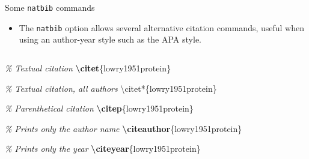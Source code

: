 \documentclass[,aspectratio=43]{beamer}
\newenvironment{Shaded}{\begin{snugshade}}{\end{snugshade}}
\newcommand{\CommentTok}[1]{\textcolor[rgb]{0.38,0.63,0.69}{\textit{#1}}}
\newcommand{\ExtensionTok}[1]{#1}
\newcommand{\FunctionTok}[1]{\textcolor[rgb]{0.02,0.16,0.49}{#1}}
\newcommand{\KeywordTok}[1]{\textcolor[rgb]{0.00,0.44,0.13}{\textbf{#1}}}
\newcommand{\NormalTok}[1]{#1}
\providecommand{\tightlist}{%
  \setlength{\itemsep}{0pt}\setlength{\parskip}{0pt}}
\begin{document}
\begin{frame}[fragile]{Some \texttt{natbib} commands}
\protect\hypertarget{some-natbib-commands}{}
\begin{itemize}
\tightlist
\item
  The \texttt{natbib} option allows several alternative citation
  commands, useful when using an author-year style such as the APA
  style.
\end{itemize}

\begin{columns}[T]
\begin{column}{0.53\textwidth}
\small
\vspace{-1em}

\begin{Shaded}
\begin{Highlighting}[]
\CommentTok{\% Textual citation}
\KeywordTok{\textbackslash{}citet}\NormalTok{\{}\ExtensionTok{lowry1951protein}\NormalTok{\}    }

\CommentTok{\% Textual citation, all authors}
\FunctionTok{\textbackslash{}citet*}\NormalTok{\{lowry1951protein\}   }

\CommentTok{\% Parenthetical citation}
\KeywordTok{\textbackslash{}citep}\NormalTok{\{}\ExtensionTok{lowry1951protein}\NormalTok{\}    }

\CommentTok{\% Prints only the author name}
\KeywordTok{\textbackslash{}citeauthor}\NormalTok{\{}\ExtensionTok{lowry1951protein}\NormalTok{\}   }

\CommentTok{\% Prints only the year }
\KeywordTok{\textbackslash{}citeyear}\NormalTok{\{}\ExtensionTok{lowry1951protein}\NormalTok{\} }
\end{Highlighting}
\end{Shaded}
\end{column}


\end{columns}
\end{frame}
\end{document}
